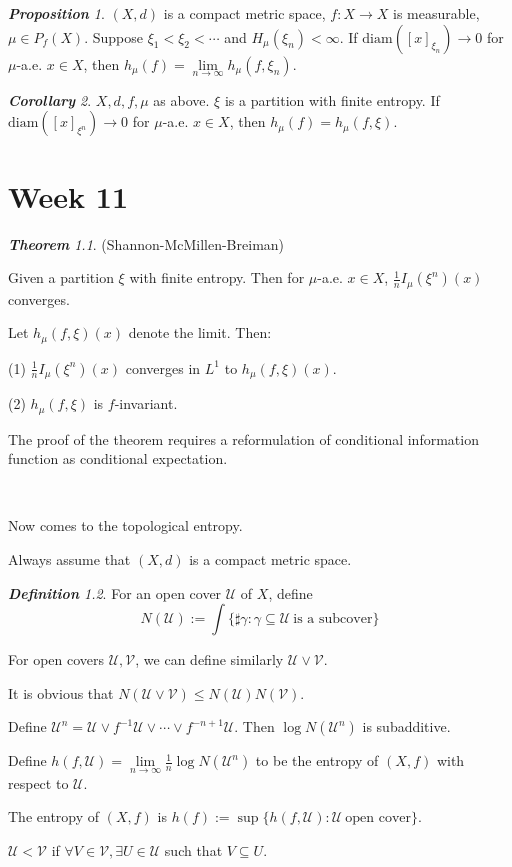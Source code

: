 \documentclass[10pt, a4paper, oneside]{report}
\numberwithin{equation}{chapter}
\theoremstyle{remark}
\newtheorem{definition}{\bf{Definition}}[chapter]
\newtheorem{theorem}[definition]{\bf{Theorem}}
\newtheorem{proposition}[definition]{\bf{Proposition}}
\newtheorem{corollary}[definition]{\bf{Corollary}}
\theoremstyle{remark}
\begin{document}
\begin{proposition}
    $(X,d)$ is a compact metric space, $f:X\rightarrow X$ is measurable, $\mu\in P_f(X)$. Suppose $\xi_1<\xi_2<\cdots$ and $H_\mu(\xi_n)<\infty$. If $\mathrm{diam}([x]_{\xi_n})\to 0$ for $\mu$-a.e. $x\in X$, then $h_\mu(f)=\lim\limits_{n\to\infty} h_\mu(f,\xi_n).$
\end{proposition}

\begin{corollary}
    $X,d,f,\mu$ as above. $\xi$ is a partition with finite entropy. If $\mathrm{diam}([x]_{\xi^n})\to 0$ for $\mu$-a.e. $x\in X$, then $h_\mu(f)=h_\mu(f,\xi)$.
\end{corollary}

\chapter{Week 11}
\begin{theorem}
(Shannon-McMillen-Breiman)

    Given a partition $\xi$ with finite entropy. Then for $\mu$-a.e. $x\in X$, $\frac{1}{n}I_\mu(\xi^n)(x)$ converges.

    Let $h_\mu(f,\xi)(x)$ denote the limit. Then:

    (1) $\frac{1}{n}I_\mu(\xi^n)(x)$ converges in $L^1$ to $h_\mu(f,\xi)(x)$.

    (2) $h_\mu(f,\xi)$ is $f$-invariant.
\end{theorem}

The proof of the theorem requires a reformulation of conditional information function as conditional expectation.

~

Now comes to the topological entropy.
    
Always assume that $(X,d)$ is a compact metric space.

\begin{definition}
    For an open cover $\mathcal{U}$ of $X$, define $$N(\mathcal{U}):=\int\{\sharp\gamma:\gamma\subseteq\mathcal{U}~\text{is a subcover}\}$$

    For open covers $\mathcal{U},\mathcal{V}$, we can define similarly $\mathcal{U}\vee\mathcal{V}$.

    It is obvious that $N(\mathcal{U}\vee\mathcal{V})\leqslant N(\mathcal{U})N(\mathcal{V})$.

    Define $\mathcal{U}^n=\mathcal{U}\vee f^{-1}\mathcal{U}\vee\cdots\vee f^{-n+1}\mathcal{U}$. Then $\log N(\mathcal{U}^n)$ is subadditive.

    Define $h(f,\mathcal{U})=\lim\limits_{n\to\infty}\frac{1}{n}\log N(\mathcal{U}^n)$ to be the entropy of $(X,f)$ with respect to $\mathcal{U}$.

    The entropy of $(X,f)$ is $h(f):=\sup\{h(f,\mathcal{U}):\mathcal{U}~\text{open cover}\}$.

    $\mathcal{U}<\mathcal{V}$ if $\forall V\in\mathcal{V},\exists U\in\mathcal{U}$ such that $V\subseteq U$.
\end{definition}
\end{document}

